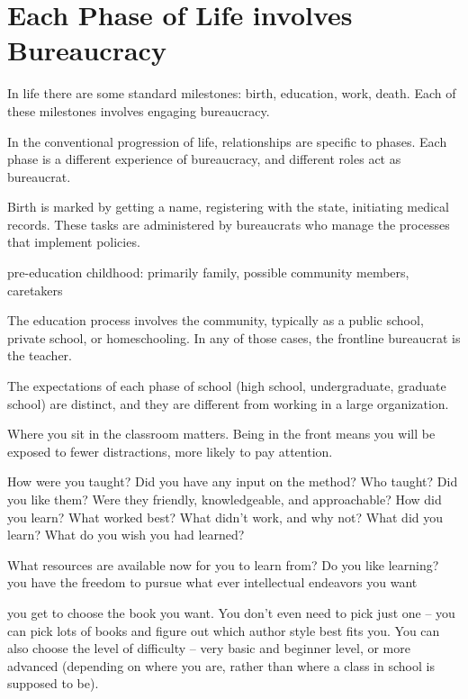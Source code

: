 \section{Each Phase of Life involves Bureaucracy}
In life there are some standard milestones: birth, education, work, death. Each of these milestones involves engaging bureaucracy. 

In the conventional progression of life, relationships are specific to phases. Each phase is a different experience of bureaucracy, and different roles act as bureaucrat. 


Birth is marked by getting a name, registering with the state, initiating medical records. These tasks are administered by bureaucrats who manage the processes that implement policies. 

pre-education childhood: primarily family, possible community members, caretakers


The education process involves the community, typically as a public school, private school, or homeschooling. In any of those cases, the frontline bureaucrat is the teacher. 



The expectations of each phase of school (high school, undergraduate, graduate school) are distinct, and they are different from working in a large organization. 

Where you sit in the classroom matters. Being in the front means you will be exposed to fewer distractions, more likely to pay attention.


How were you taught? Did you have any input on the method?
Who taught? Did you like them? Were they friendly, knowledgeable, and approachable?
How did you learn? What worked best? What didn't work, and why not?
What did you learn? What do you wish you had learned?

What resources are available now for you to learn from? Do you like learning?
you have the freedom to pursue what ever intellectual endeavors you want

you get to choose the book you want. You don't even need to pick just one -- you can pick lots of books and figure out which author style best fits you. You can also choose the level of difficulty -- very basic and beginner level, or more advanced (depending on where you are, rather than where a class in school is supposed to be).

